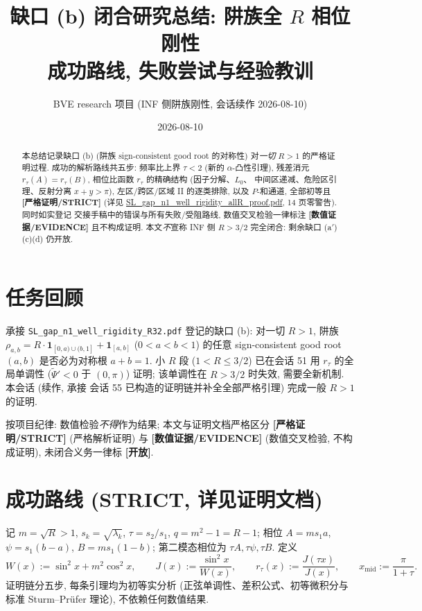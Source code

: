 \documentclass[UTF8]{ctexart}
\title{缺口 (b) 闭合研究总结: 阱族全 $R$ 相位刚性\\[-2mm]
\large 成功路线, 失败尝试与经验教训}
\author{BVE research 项目 (INF 侧阱族刚性, 会话续作 2026-08-10)}
\date{2026-08-10}
\newcommand{\STRICT}{\textbf{[严格证明/STRICT]}}
\newcommand{\EVID}{\textbf{[数值证据/EVIDENCE]}}
\newcommand{\OPEN}{\textbf{[开放]}}
\begin{document}
\maketitle

\begin{abstract}
本总结记录缺口 (b) (阱族 sign-consistent good root 的对称性) 对\emph{一切} $R>1$
的严格证明过程. 成功的解析路线共五步: 频率比上界 $\tau<2$ (新的 $\alpha$-凸性引理),
残差消元 $r_\tau(A)=r_\tau(B)$, 相位比函数 $r_\tau$ 的精确结构 (因子分解、$L_0$、
中间区递减、危险区引理、反射分离 $x+y>\pi$), 左区/跨区/区域 II 的逐类排除, 以及
$P$-和通道, 全部初等且 \STRICT{} (详见
\url{SL_gap_n1_well_rigidity_allR_proof.pdf}, 14 页零警告). 同时如实登记
交接手稿中的错误与所有失败/受阻路线, 数值交叉检验一律标注 \EVID{} 且不构成证明.
本文\emph{不}宣称 INF 侧 $R>3/2$ 完全闭合: 剩余缺口 (a$'$)(c)(d) 仍开放.
\end{abstract}

\tableofcontents

\section{任务回顾}

承接 \texttt{SL\_gap\_n1\_well\_rigidity\_R32.pdf} 登记的缺口 (b): 对一切 $R>1$,
阱族 $\rho_{a,b}=R\cdot\mathbf1_{[0,a)\cup(b,1]}+\mathbf1_{[a,b]}$
($0<a<b<1$) 的任意 sign-consistent good root $(a,b)$ 是否必为对称根 $a+b=1$.
小 $R$ 段 ($1<R\le3/2$) 已在会话 51 用 $r_\tau$ 的全局单调性 ($\widetilde\Psi'<0$
于 $(0,\pi)$) 证明; 该单调性在 $R>3/2$ 时失效, 需要全新机制. 本会话 (续作, 承接
会话 55 已构造的证明链并补全全部严格引理) 完成一般 $R>1$ 的证明.

按项目纪律: 数值检验\emph{不得}作为结果; 本文与证明文档严格区分
\STRICT{} (严格解析证明) 与 \EVID{} (数值交叉检验, 不构成证明), 未闭合义务一律标
\OPEN{}.

\section{成功路线 (STRICT, 详见证明文档)}

记 $m=\sqrt R>1$, $s_k=\sqrt{\lambda_k}$, $\tau=s_2/s_1$, $q=m^2-1=R-1$;
相位 $A=ms_1a$, $\psi=s_1(b-a)$, $B=ms_1(1-b)$; 第二模态相位为
$\tau A,\tau\psi,\tau B$. 定义
\begin{equation}
	W(x):=\sin^2x+m^2\cos^2x,\qquad
	J(x):=\frac{\sin^2x}{W(x)},\qquad
	r_\tau(x):=\frac{J(\tau x)}{J(x)},\qquad
	x_{\mathrm{mid}}:=\frac{\pi}{1+\tau}.
\end{equation}
证明链分五步, 每条引理均为初等实分析 (正弦单调性、差积公式、初等微积分与标准
Sturm--Pr\"ufer 理论), 不依赖任何数值结果.
\end{document}
